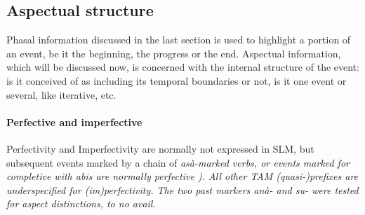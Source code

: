 \subsection{Aspectual structure}\label{sec:func:Aspectualstructure}
Phasal information discussed in the last section is used to highlight a portion of an event, be it the beginning, the progress or the end.  Aspectual information, which will be discussed now, is concerned with the internal structure of the event: is it conceived of as including its temporal boundaries or not, is it one event or several, like iterative, etc.

\paragraph{Perfective and imperfective}\label{sec:func:asp:Imperfective}
Perfectivity and Imperfectivity are normally not expressed in SLM, but subsequent events marked by a chain of \em asà-\em marked verbs, or events marked for completive with \em abis \em are normally perfective \citet[171]{SmithEtAl2007}). All other TAM (quasi-)prefixes are underspecified for (im)perfectivity. The two past markers \em anà- \em and \em su- \em were tested for aspect distinctions, to no avail.


